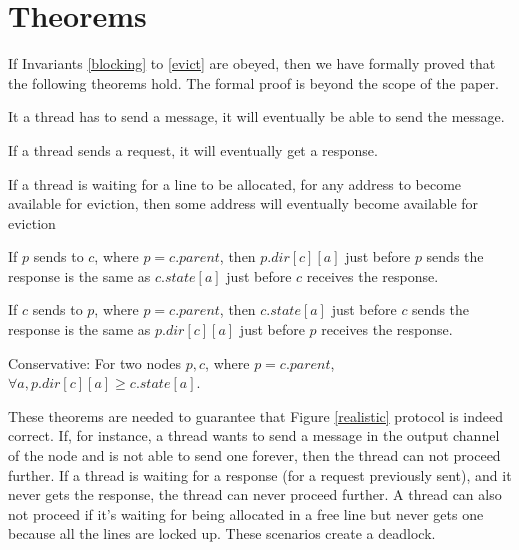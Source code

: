 \section{Theorems}
\label{sec:theorems}

If Invariants \ref{blocking} to \ref{evict} are obeyed, then we have formally
proved that the following theorems hold. The formal proof is beyond the scope of
the paper.

\begin{theorem}
It a thread has to send a message, it will eventually be able to send the
message.
\label{canSend}
\end{theorem}

\begin{theorem}
If a thread sends a request, it will eventually get a response.
\label{willRecv}
\end{theorem}

\begin{theorem}
If a thread is waiting for a line to be allocated, \ie for any address to become
available for eviction, then some address will eventually become available for
eviction
\label{evictDead}
\end{theorem}

\begin{theorem}
If $p$ sends  to $c$, where $p = c.parent$, then $p.dir[c][a]$
just before $p$ sends the response is the same as $c.state[a]$ just before $c$
receives the response.
\label{pcSame}
\end{theorem}

\begin{theorem}
If $c$ sends  to $p$, where $p = c.parent$, then $c.state[a]$
just before $c$ sends the response is the same as $p.dir[c][a]$ just before $p$
receives the response.
\label{cpSame}
\end{theorem}

\begin{theorem}
Conservative: For two nodes $p, c$, where $p = c.parent$, $\forall a,
p.dir[c][a] \ge c.state[a]$.
\label{conservative}
\end{theorem}

These theorems are needed to guarantee that Figure \ref{realistic} protocol is
indeed correct. If, for instance, a thread wants to send a message in the
output channel of the node and is not able to send one forever, then the thread
can not proceed further. If a thread is waiting for a response (for a request
previously sent), and it never gets the response, the thread can never proceed
further. A thread can also not proceed if it's waiting for being allocated in a
free line but never gets one because all the lines are locked up. These
scenarios create a deadlock.

